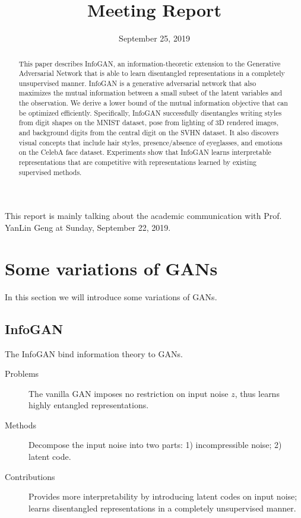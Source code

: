 \documentclass[12pt]{utils/mydoc}
\title{\bfseries \sffamily Meeting Report}
\date{September 25, 2019} %
\begin{document}
\maketitle

This report is mainly talking about the academic communication with 
Prof. YanLin Geng at Sunday, September 22, 2019.

\section{Some variations of GANs}

In this section we will introduce some variations of GANs.

\subsection{InfoGAN}

The InfoGAN\cite{Chen2016InfoGAN} bind information theory to GANs.

\begin{abstract}
  This paper describes InfoGAN, an information-theoretic extension to the Generative 
  Adversarial Network that is able to learn disentangled representations in a
  completely unsupervised manner. InfoGAN is a generative adversarial network
  that also maximizes the mutual information between a small subset of the latent
  variables and the observation. We derive a lower bound of the mutual information
  objective that can be optimized efficiently. Specifically, InfoGAN successfully
  disentangles writing styles from digit shapes on the MNIST dataset, pose from
  lighting of 3D rendered images, and background digits from the central digit on
  the SVHN dataset. It also discovers visual concepts that include hair styles, 
  presence/absence of eyeglasses, and emotions on the CelebA face dataset. Experiments
  show that InfoGAN learns interpretable representations that are competitive with
  representations learned by existing supervised methods.
\end{abstract}

\begin{description}
  \item[Problems] The vanilla GAN imposes no restriction on input noise $z$, thus learns
    highly entangled representations.
  \item[Methods] Decompose the input noise into two parts: 1) incompressible noise; 2) 
    latent code.
  \item[Contributions] Provides more interpretability by introducing latent codes on input
    noise; learns disentangled representations in a completely unsupervised manner. 
\end{description}
\end{document}
